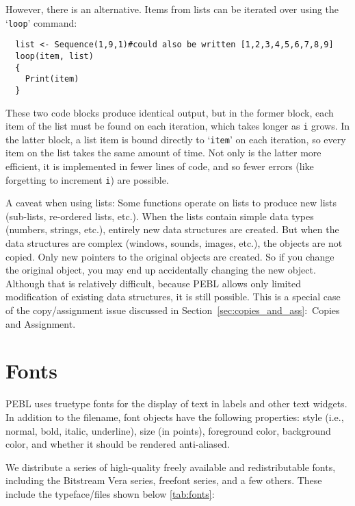However, there is an alternative.  Items from
lists can be iterated over using the `\texttt{loop}' command:  
\begin{verbatim}
  list <- Sequence(1,9,1)#could also be written [1,2,3,4,5,6,7,8,9]
  loop(item, list) 
  {
    Print(item)
  }
\end{verbatim}
These two code blocks produce identical output, but in the former block, each item of the list must be found on each iteration, which takes longer as \texttt{i} grows. In the latter block, a list item is bound directly to `\texttt{item}' on each iteration, so every item on the list takes the same amount of time. Not only is the latter more efficient, it is implemented in fewer lines of code, and so fewer errors (like forgetting to increment \texttt{i}) are possible.

A caveat when using lists: Some functions operate on lists to produce
new lists (sub-lists, re-ordered lists, etc.). When the lists contain
simple data types (numbers, strings, etc.), entirely new data
structures are created. But when the data structures are complex
(windows, sounds, images, etc.), the objects are not copied. Only new
pointers to the original objects are created. So if you change the
original object, you may end up accidentally changing the new
object. Although that is relatively difficult, because PEBL allows
only limited modification of existing data structures, it is still
possible. This is a special case of the copy/assignment issue
discussed in Section~\ref{sec:copies_and_ass}:~Copies and Assignment.




\section{Fonts}

PEBL uses truetype fonts for the display of text in labels and other text
widgets.  In addition to the filename, font objects have the following properties: style (i.e., normal, bold, italic, underline), size (in points),
foreground color, background color, and whether it should be rendered
anti-aliased.

We distribute a series of high-quality freely available
and redistributable fonts, including the Bitstream Vera series,
freefont series, and a few others.  These include
the typeface/files shown below \ref{tab:fonts}:

